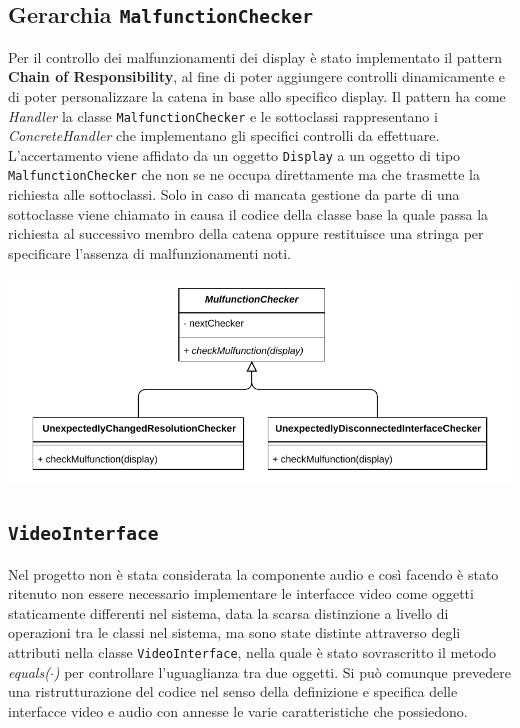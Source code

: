 \documentclass[a4paper,11pt]{article}
\begin{document}
	\subsection{Gerarchia \texttt{MalfunctionChecker}}
	Per il controllo dei malfunzionamenti dei display è stato implementato il pattern \textbf{Chain of Responsibility}, al fine di poter aggiungere controlli dinamicamente e di poter personalizzare la catena in base allo specifico display. Il pattern ha come \textit{Handler} la classe \texttt{MalfunctionChecker} e le sottoclassi rappresentano i \textit{ConcreteHandler} che implementano gli specifici controlli da effettuare.\\
	L'accertamento viene affidato da un oggetto \texttt{Display} a un oggetto di tipo \texttt{MalfunctionChecker} che non se ne occupa direttamente ma che trasmette la richiesta alle sottoclassi. Solo in caso di mancata gestione da parte di una sottoclasse viene chiamato in causa il codice della classe base la quale passa la richiesta al successivo membro della catena oppure restituisce una stringa per specificare l'assenza di malfunzionamenti noti.\\
	\begin{minipage}[c]{\textwidth}
		\centering
		\includegraphics[width=.5\textwidth]{diagramma/ClassDiagramm-MalfunctionChecker.pdf}
		\label{fig:malfunction}
	\end{minipage}
	
	\subsection{\texttt{VideoInterface}}
	Nel progetto non è stata considerata la componente audio e così facendo è stato ritenuto non essere necessario implementare le interfacce video come oggetti staticamente differenti nel sistema, data la scarsa distinzione a livello di operazioni tra le classi nel sistema, ma sono state distinte attraverso degli attributi nella classe \texttt{VideoInterface}, nella quale è stato sovrascritto il metodo \textit{equals($\cdot$)} per controllare l'uguaglianza tra due oggetti. Si può comunque prevedere una ristrutturazione del codice nel senso della definizione e specifica delle interfacce video e audio con annesse le varie caratteristiche che possiedono.\\
	
\end{document}
